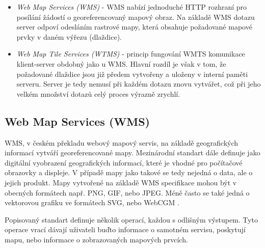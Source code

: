 \newpage
\begin{itemize}
\item\textit{Web Map Services (WMS)} - WMS nabízí jednoduché HTTP
  rozhraní pro posílání žádostí o georeferencovaný mapový obraz. Na
  základě WMS dotazu server odpoví odesláním rastrové mapy, která
  obsahuje požadované mapové prvky v daném výřezu (dlaždice).
	 
\item\textit{Web Map Tile Services (WTMS)} - princip fungování WMTS
  komunikace klient-server obdobný jako u WMS. Hlavní rozdíl je však v
  tom, že požadované dlaždice jsou již předem vytvořeny a uloženy
  v interní paměti serveru. Server je tedy nemusí při každém dotazu
  znovu vytvářet, což při jeho velkém množství dotazů celý proces
  výrazně zrychlí.
\end{itemize}

\subsection{Web Map Services (WMS)}

WMS, v českém překladu webový mapový servis, na základě geografických
informací vytváří georeferencované mapy. Mezinárodní standart dále
definuje  jako digitální vyobrazení geografických informací,
které je vhodné pro počítačové obrazovky a displeje. V případě mapy
jako takové se tedy nejedná o data, ale o jejich produkt. Mapy
vytvořené na základě WMS specifikace mohou být v obecných formátech
např. PNG, GIF, nebo JPEG. Méně často se také jedná o vektorovou
grafiku ve formátech SVG, nebo WebCGM \cite{oqc_wms}.

Popisovaný standart definuje několik operací, každou s odlišným
výstupem. Tyto operace vrací dávají uživateli buďto informace o
samotném servisu, poskytují mapu, nebo informace o zobrazovaných
mapových prvcích.

